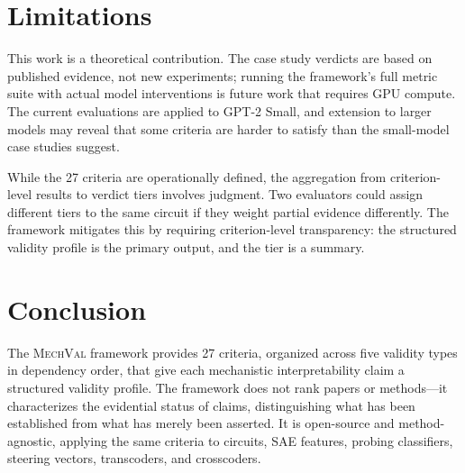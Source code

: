 \documentclass[10pt]{article}
\newcommand{\mechval}{\textsc{MechVal}}
\begin{document}
\section{Limitations}
\label{sec:limitations}

This work is a theoretical contribution. The case study verdicts are based on published evidence, not new experiments; running the framework's full metric suite with actual model interventions is future work that requires GPU compute. The current evaluations are applied to GPT-2 Small, and extension to larger models may reveal that some criteria are harder to satisfy than the small-model case studies suggest.

While the 27 criteria are operationally defined, the aggregation from criterion-level results to verdict tiers involves judgment. Two evaluators could assign different tiers to the same circuit if they weight partial evidence differently. The framework mitigates this by requiring criterion-level transparency: the structured validity profile is the primary output, and the tier is a summary.

\section{Conclusion}
\label{sec:conclusion}

The \mechval{} framework provides 27 criteria, organized across five validity types in dependency order, that give each mechanistic interpretability claim a structured validity profile. The framework does not rank papers or methods---it characterizes the evidential status of claims, distinguishing what has been established from what has merely been asserted. It is open-source and method-agnostic, applying the same criteria to circuits, SAE features, probing classifiers, steering vectors, transcoders, and crosscoders.

% 
% 

\end{document}
